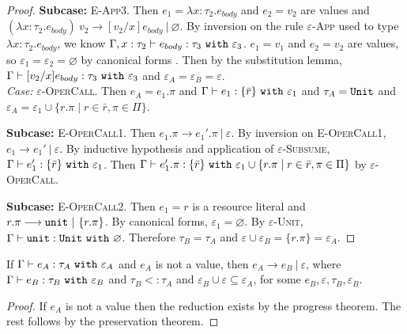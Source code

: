 \begin{appendix}
\begin{proof}
\textbf{Subcase:} \textsc{E-App3}. Then $e_1 = \lambda x: \tau_2.e_{body}$ and $e_2 = v_2$ are values and $(\lambda x: \tau_2.e_{body})~v_2 \longrightarrow [v_2/x]e_{body}~|~\varnothing$. By inversion on the rule \textsc{$\varepsilon$-App} used to type $\lambda x:  \tau_2. e_{body}$, we know $\Gamma, x:  \tau_2 \vdash e_{body}: \tau_3~\mathtt{with}~ \varepsilon_3$. $e_1 = v_1$ and $e_2 = v_2$ are values, so $\varepsilon_1 = \varepsilon_2 = \varnothing$ by canonical forms . Then by the substitution lemma, $ \Gamma \vdash [ v_2/x] e_{body} :  \tau_3~\mathtt{with}~ \varepsilon_3$ and $\varepsilon_A = \varepsilon_B = \varepsilon$. \\

\textit{Case:}  \textsc{$\varepsilon$-OperCall}. Then $e_A = e_1.\pi$ and $\Gamma \vdash e_1: \{ \bar r \}~\mathtt{with}~ \varepsilon_1$ and $\tau_A = \mathtt{Unit}$ and $\varepsilon_A = \varepsilon_1 \cup \{ r.\pi \mid r \in \bar r, \pi \in \Pi \}$.

\textbf{Subcase:} \textsc{E-OperCall1}. Then $e_1.\pi \longrightarrow e_1'.\pi~|~\varepsilon$. By inversion on \textsc{E-OperCall1}, $e_1 \longrightarrow e_1'~|~\varepsilon$. By inductive hypothesis and application of \textsc{$\varepsilon$-Subsume}, $\Gamma \vdash e_1': \{ \bar r \}~\mathtt{with}~ \varepsilon_1$. Then $\Gamma \vdash e_1'.\pi: \{ \bar r \}~\mathtt{with}~ \varepsilon_1 \cup \{ r.\pi \mid r \in \bar r, \pi \in \Pi \}$ by \textsc{$\varepsilon$-OperCall}.


\textbf{Subcase:} \textsc{E-OperCall2}. Then $e_1 = r$ is a resource literal and $r.\pi \longrightarrow \mathtt{unit}~|~\{ r.\pi \}$. By canonical forms, $\varepsilon_1 = \varnothing$. By \textsc{$\varepsilon$-Unit}, $ \Gamma \vdash \mathtt{unit}: \mathtt{Unit}~\mathtt{with}~ \varnothing$. Therefore $\tau_B = \tau_A$ and $\varepsilon \cup \varepsilon_B = \{ r.\pi \} = \varepsilon_A$.
\end{proof}

\hrulefill


\begin{theorem}
If $ \Gamma \vdash  e_A:  \tau_A~\mathtt{with}~ \varepsilon_A$ and $ e_A$ is not a value, then $e_A \longrightarrow e_B~|~\varepsilon$, where $ \Gamma \vdash e_B:  \tau_B~\mathtt{with}~ \varepsilon_B$ and $ \tau_B <:  \tau_A$ and $\varepsilon_B \cup \varepsilon \subseteq \varepsilon_A$, for some $e_B, \varepsilon, \tau_B, \varepsilon_B$.
\end{theorem}
\begin{proof}
If $ e_A$ is not a value then the reduction exists by the progress theorem. The rest follows by the preservation theorem.
\end{proof}


\end{appendix}
